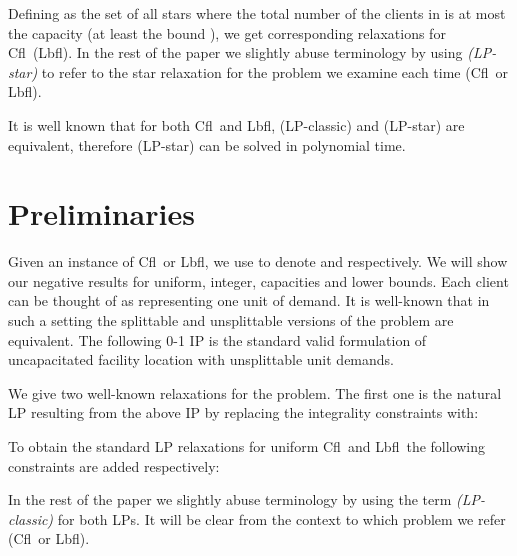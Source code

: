 \documentclass[11pt]{article}\usepackage{amsmath}
\newcommand{\lbfl}{{\sc Lbfl}}
\newcommand{\cfl}{{\sc Cfl}}
\begin{document}
Defining  as the set of all stars  where  the total number of the clients in  
is at most the
capacity  (at least the bound ),  we get corresponding relaxations for
  \cfl\ (\lbfl).
In the rest of the paper we  slightly abuse terminology by 
using    {\em (LP-star)}  to refer to the
star relaxation for the problem we examine each time (\cfl\  or \lbfl).

It is well known  that for both \cfl\ and \lbfl, (LP-classic) and (LP-star) are
equivalent, therefore (LP-star) can be solved in  polynomial time.





\fi 





\section{Preliminaries}
\label{sec:prel}


Given an instance  of \cfl\ or \lbfl, we use  to denote  and 
respectively.
We will show our negative results for uniform, integer, capacities and lower
bounds. Each client can be thought of as representing one unit of demand.
 It  is  well-known  that in such a setting  the  splittable  and
unsplittable versions  of the problem are equivalent. 
The following 0-1  IP is the standard  valid formulation of uncapacitated 
facility location with unsplittable unit demands.

\iffalse 

\fi




\iffalse 

\fi 


We give two well-known relaxations  for the problem.  The first one is the
natural  LP resulting from the above IP by replacing the integrality constraints
 with: 

 

\iffalse

\fi
To obtain the standard LP relaxations for 
uniform \cfl\ and \lbfl\ the following constraints are added
respectively:

 

\iffalse

\fi

In the rest of the paper we slightly abuse terminology by 
using  the term {\em (LP-classic)} for both LPs. It will be clear from the context to
which problem we refer (\cfl\  or \lbfl). 
\end{document}
